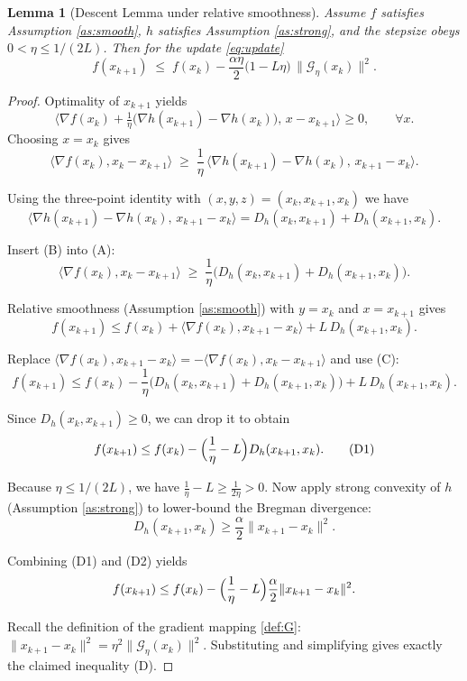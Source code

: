 \documentclass{article}
\newtheorem{lemma}{Lemma}
\newcommand{\Breg}{D_{h}}
\newcommand{\grad}{\nabla}
\begin{document}
\begin{lemma}[Descent Lemma under relative smoothness]\label{lem:descent}
Assume $f$ satisfies Assumption \ref{as:smooth}, $h$ satisfies Assumption \ref{as:strong},
and the stepsize obeys $0<\eta\le 1/(2L)$.  Then for the update \eqref{eq:update}
\[
f(x_{k+1})
\;\le\;
f(x_{k})-\frac{\alpha\eta}{2}\bigl(1-L\eta\bigr)\,\bigl\|\mathcal{G}_{\eta}(x_{k})\bigr\|^{2}.
\tag{D}
\]
\end{lemma}
\begin{proof}
Optimality of $x_{k+1}$ yields
\[
\big\langle \grad f(x_{k})+\tfrac{1}{\eta}\big(\grad h(x_{k+1})-\grad h(x_{k})\big),\,x-x_{k+1}\big\rangle\ge0,
\qquad\forall x.
\]
Choosing $x=x_{k}$ gives
\[
\langle \grad f(x_{k}),x_{k}-x_{k+1}\rangle
\;\ge\;
\frac{1}{\eta}\,\langle \grad h(x_{k+1})-\grad h(x_{k}),\,x_{k+1}-x_{k}\rangle .
\tag{A}
\]

Using the three‑point identity with $(x,y,z)=(x_{k},x_{k+1},x_{k})$ we have
\[
\langle \grad h(x_{k+1})-\grad h(x_{k}),\,x_{k+1}-x_{k}\rangle
= \Breg(x_{k},x_{k+1})+\Breg(x_{k+1},x_{k}).
\tag{B}
\]

Insert (B) into (A):
\[
\langle \grad f(x_{k}),x_{k}-x_{k+1}\rangle
\;\ge\;
\frac{1}{\eta}\bigl(\Breg(x_{k},x_{k+1})+\Breg(x_{k+1},x_{k})\bigr).
\tag{C}
\]

Relative smoothness (Assumption \ref{as:smooth}) with $y=x_{k}$ and $x=x_{k+1}$ gives
\[
f(x_{k+1})
\le f(x_{k})+\langle \grad f(x_{k}),x_{k+1}-x_{k}\rangle
+L\,\Breg(x_{k+1},x_{k}).
\tag{D0}
\]

Replace $\langle \grad f(x_{k}),x_{k+1}-x_{k}\rangle = -\langle \grad f(x_{k}),x_{k}-x_{k+1}\rangle$
and use (C):
\[
f(x_{k+1})
\le f(x_{k})-
\frac{1}{\eta}\bigl(\Breg(x_{k},x_{k+1})+\Breg(x_{k+1},x_{k})\bigr)
+L\,\Breg(x_{k+1},x_{k}).
\]

Since $\Breg(x_{k},x_{k+1})\ge0$, we can drop it to obtain
\[
f(x_{k+1})
\le f(x_{k})-
\Bigl(\frac{1}{\eta}-L\Bigr)\Breg(x_{k+1},x_{k}).
\tag{D1}
\]

Because $\eta\le 1/(2L)$, we have $\frac{1}{\eta}-L\ge \frac{1}{2\eta}>0$.
Now apply strong convexity of $h$ (Assumption \ref{as:strong}) to lower‑bound the Bregman divergence:
\[
\Breg(x_{k+1},x_{k})\ge\frac{\alpha}{2}\|x_{k+1}-x_{k}\|^{2}.
\tag{D2}
\]

Combining (D1) and (D2) yields
\[
f(x_{k+1})
\le f(x_{k})-
\Bigl(\frac{1}{\eta}-L\Bigr)\frac{\alpha}{2}\|x_{k+1}-x_{k}\|^{2}.
\]

Recall the definition of the gradient mapping \eqref{def:G}:
$\|x_{k+1}-x_{k}\|^{2}= \eta^{2}\|\mathcal{G}_{\eta}(x_{k})\|^{2}$.
Substituting and simplifying gives exactly the claimed inequality (D).
\end{proof}
\end{document}
